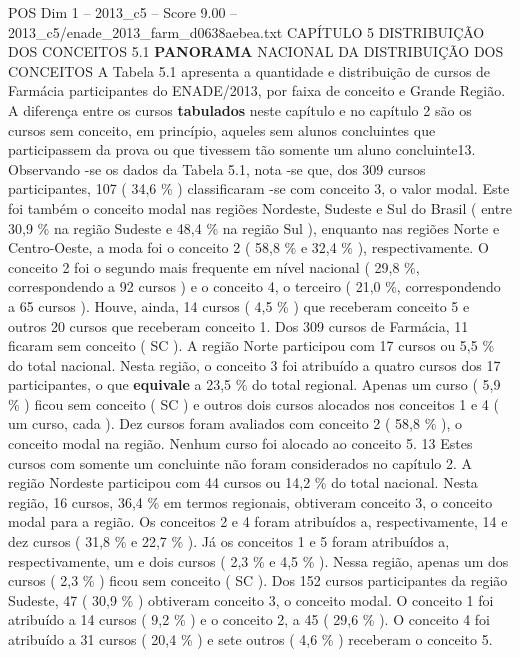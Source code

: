 \begin{textsample}{POS Dim 1 – 2013\_c5 – Score 9.00 – 2013\_c5/enade\_2013\_farm\_d0638aebea.txt}  \label{ex:f1_pos_087}
CAPÍTULO 5 DISTRIBUIÇÃO DOS CONCEITOS 5.1 \textbf{PANORAMA} NACIONAL DA DISTRIBUIÇÃO DOS CONCEITOS A Tabela 5.1 apresenta a quantidade e distribuição de cursos de Farmácia participantes do ENADE/2013, por faixa de conceito e Grande Região.
A diferença entre os cursos \textbf{tabulados} neste capítulo e no capítulo 2 são os cursos sem conceito, em princípio, aqueles sem alunos concluintes que participassem da prova ou que tivessem tão somente um aluno concluinte13.
Observando -se os dados da Tabela 5.1, nota -se que, dos 309 cursos participantes, 107 ( 34,6 \% ) classificaram -se com conceito 3, o valor modal.
Este foi também o conceito modal nas regiões Nordeste, Sudeste e Sul do Brasil ( entre 30,9 \% na região Sudeste e 48,4 \% na região Sul ), enquanto nas regiões Norte e Centro-Oeste, a moda foi o conceito 2 ( 58,8 \% e 32,4 \% ), respectivamente.
O conceito 2 foi o segundo mais frequente em nível nacional ( 29,8 \%, correspondendo a 92 cursos ) e o conceito 4, o terceiro ( 21,0 \%, correspondendo a 65 cursos ).
Houve, ainda, 14 cursos ( 4,5 \% ) que receberam conceito 5 e outros 20 cursos que receberam conceito 1.
Dos 309 cursos de Farmácia, 11 ficaram sem conceito ( SC ).
A região Norte participou com 17 cursos ou 5,5 \% do total nacional.
Nesta região, o conceito 3 foi atribuído a quatro cursos dos 17 participantes, o que \textbf{equivale} a 23,5 \% do total regional.
Apenas um curso ( 5,9 \% ) ficou sem conceito ( SC ) e outros dois cursos alocados nos conceitos 1 e 4 ( um curso, cada ).
Dez cursos foram avaliados com conceito 2 ( 58,8 \% ), o conceito modal na região.
Nenhum curso foi alocado ao conceito 5. 13 Estes cursos com somente um concluinte não foram considerados no capítulo 2.
A região Nordeste participou com 44 cursos ou 14,2 \% do total nacional.
Nesta região, 16 cursos, 36,4 \% em termos regionais, obtiveram conceito 3, o conceito modal para a região.
Os conceitos 2 e 4 foram atribuídos a, respectivamente, 14 e dez cursos ( 31,8 \% e 22,7 \% ).
Já os conceitos 1 e 5 foram atribuídos a, respectivamente, um e dois cursos ( 2,3 \% e 4,5 \% ).
Nessa região, apenas um dos cursos ( 2,3 \% ) ficou sem conceito ( SC ).
Dos 152 cursos participantes da região Sudeste, 47 ( 30,9 \% ) obtiveram conceito 3, o conceito modal.
O conceito 1 foi atribuído a 14 cursos ( 9,2 \% ) e o conceito 2, a 45 ( 29,6 \% ).
O conceito 4 foi atribuído a 31 cursos ( 20,4 \% ) e sete outros ( 4,6 \% ) receberam o conceito 5.

\end{textsample}
